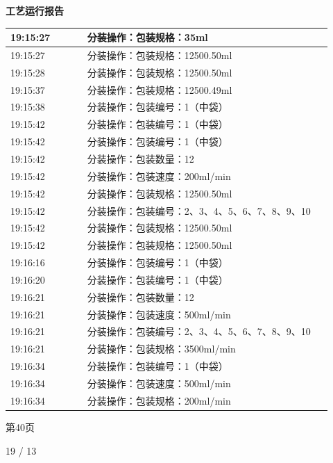 \documentclass[UTF8,10pt,a4paper,fontset=fandol]{ctexart}
\newcommand{\handwritten}[1]{#1}
\begin{document}
\hfill
\begin{minipage}[t]{0.47\linewidth}
\centering
\textbf{工艺运行报告}

\smallskip
\begin{tabular}{|p{0.22\linewidth}|p{0.70\linewidth}|}
\hline
19:15:27 & 分装操作：包装规格：35ml \\ \hline
19:15:27 & 分装操作：包装规格：12500.50ml \\ \hline
19:15:28 & 分装操作：包装规格：12500.50ml \\ \hline
19:15:37 & 分装操作：包装规格：12500.49ml \\ \hline
19:15:38 & 分装操作：包装编号：1（中袋） \\ \hline
19:15:42 & 分装操作：包装编号：1（中袋） \\ \hline
19:15:42 & 分装操作：包装编号：1（中袋） \\ \hline
19:15:42 & 分装操作：包装数量：12 \\ \hline
19:15:42 & 分装操作：包装速度：200ml/min \\ \hline
19:15:42 & 分装操作：包装规格：12500.50ml \\ \hline
19:15:42 & 分装操作：包装编号：2、3、4、5、6、7、8、9、10 \\ \hline
19:15:42 & 分装操作：包装规格：12500.50ml \\ \hline
19:15:42 & 分装操作：包装规格：12500.50ml \\ \hline
19:16:16 & 分装操作：包装编号：1（中袋） \\ \hline
19:16:20 & 分装操作：包装编号：1（中袋） \\ \hline
19:16:21 & 分装操作：包装数量：12 \\ \hline
19:16:21 & 分装操作：包装速度：500ml/min \\ \hline
19:16:21 & 分装操作：包装编号：2、3、4、5、6、7、8、9、10 \\ \hline
19:16:21 & 分装操作：包装规格：3500ml/min \\ \hline
19:16:34 & 分装操作：包装编号：1（中袋） \\ \hline
19:16:34 & 分装操作：包装速度：500ml/min \\ \hline
19:16:34 & 分装操作：包装规格：200ml/min \\ \hline
\end{tabular}

\smallskip
第40页
\end{minipage}

\bigskip

\handwritten{19 / 13}
\end{document}
